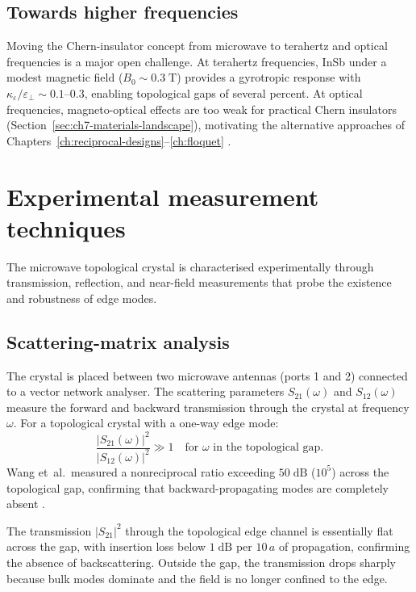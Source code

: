 \subsection{Towards higher frequencies}
\label{sec:ch9-higher-freq}

Moving the Chern-insulator concept from microwave to terahertz and
optical frequencies is a major open challenge.  At terahertz
frequencies, InSb under a modest magnetic field ($B_0\sim 0.3\;\mathrm{T}$)
provides a gyrotropic response with $\kappa_\varepsilon/\varepsilon_\perp
\sim 0.1$--$0.3$, enabling topological gaps of several percent.
At optical frequencies, magneto-optical effects are too weak for
practical Chern insulators (Section~\ref{sec:ch7-materials-landscape}),
motivating the alternative approaches of
Chapters~\ref{ch:reciprocal-designs}--\ref{ch:floquet}
\cite{ozawa2018topological}.

\section{Experimental measurement techniques}
\label{sec:ch9-measurement-techniques}

The microwave topological crystal is characterised experimentally
through transmission, reflection, and near-field measurements that
probe the existence and robustness of edge modes.

\subsection{Scattering-matrix analysis}
\label{sec:ch9-scattering-matrix}

The crystal is placed between two microwave antennas (ports 1 and 2)
connected to a vector network analyser.  The scattering parameters
$S_{21}(\omega)$ and $S_{12}(\omega)$ measure the forward and
backward transmission through the crystal at frequency $\omega$.  For
a topological crystal with a one-way edge mode:
\begin{equation}\label{eq:ch9-nonreciprocal-ratio}
  \frac{|S_{21}(\omega)|^2}{|S_{12}(\omega)|^2}
  \gg 1
  \quad\text{for $\omega$ in the topological gap.}
\end{equation}
Wang et~al.\ measured a nonreciprocal ratio exceeding $50\;\mathrm{dB}$
($10^5$) across the topological gap, confirming that backward-propagating
modes are completely absent \cite{nature2026observation}.

The transmission $|S_{21}|^2$ through the topological edge channel is
essentially flat across the gap, with insertion loss below
$1\;\mathrm{dB}$ per $10\,a$ of propagation, confirming the absence
of backscattering.  Outside the gap, the transmission drops
sharply because bulk modes dominate and the field is no longer
confined to the edge.

